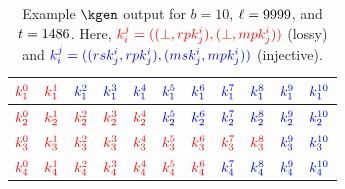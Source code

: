 \begin{table}
	\centering
	\begin{tabular}{|c|c|c|c|c|c|c|c|c|c|c|}
		\hline
		$\textcolor{red}{k^{0}_{1}}$ & $\textcolor{red}{k^{1}_{1}}$ & $\textcolor{blue}{k^{2}_{1}}$ & $\textcolor{blue}{k^{3}_{1}}$ & $\textcolor{blue}{k^{4}_{1}}$ & $\textcolor{blue}{k^{5}_{1}}$ & $\textcolor{blue}{k^{6}_{1}}$ & $\textcolor{blue}{k^{7}_{1}}$ & $\textcolor{blue}{k^{8}_{1}}$ & $\textcolor{blue}{k^{9}_{1}}$ & $\textcolor{blue}{k^{10}_{1}}$ \\
		\hline
		$\textcolor{red}{k^{0}_{2}}$ & $\textcolor{red}{k^{1}_{2}}$ & $\textcolor{red}{k^{2}_{2}}$  & $\textcolor{red}{k^{3}_{2}}$  & $\textcolor{red}{k^{4}_{2}}$  & $\textcolor{blue}{k^{5}_{2}}$ & $\textcolor{blue}{k^{6}_{2}}$ & $\textcolor{blue}{k^{7}_{2}}$ & $\textcolor{blue}{k^{8}_{2}}$ & $\textcolor{blue}{k^{9}_{2}}$ & $\textcolor{blue}{k^{10}_{2}}$ \\
		\hline
		$\textcolor{red}{k^{0}_{3}}$ & $\textcolor{red}{k^{1}_{3}}$ & $\textcolor{red}{k^{2}_{3}}$  & $\textcolor{red}{k^{3}_{3}}$  & $\textcolor{red}{k^{4}_{3}}$  & $\textcolor{red}{k^{5}_{3}}$  & $\textcolor{red}{k^{6}_{3}}$  & $\textcolor{red}{k^{7}_{3}}$  & $\textcolor{red}{k^{8}_{3}}$  & $\textcolor{blue}{k^{9}_{3}}$ & $\textcolor{blue}{k^{10}_{3}}$ \\
		\hline
		$\textcolor{red}{k^{0}_{4}}$ & $\textcolor{red}{k^{1}_{4}}$ & $\textcolor{red}{k^{2}_{4}}$  & $\textcolor{red}{k^{3}_{4}}$  & $\textcolor{red}{k^{4}_{4}}$  & $\textcolor{red}{k^{5}_{4}}$  & $\textcolor{red}{k^{6}_{4}}$  & $\textcolor{blue}{k^{7}_{4}}$ & $\textcolor{blue}{k^{8}_{4}}$ & $\textcolor{blue}{k^{9}_{4}}$ & $\textcolor{blue}{k^{10}_{4}}$ \\
		\hline
	\end{tabular}
	\caption[Example $\kgen$ output for $b=10$, $\maxt=9999$, and $\thr=1486$]{Example $\kgen$ output for $b=10$, $\maxt=9999$, and $\thr=1486$. Here, $\textcolor{red}{k^{j}_{i} = ((\bot, rpk^i_j), (\bot, mpk^i_j))}$  (lossy) and $\textcolor{blue}{k^j_i = ((rsk^i_j, rpk^i_j), (msk_j^i, mpk^i_j))}$ (injective).} \label{tab:expk}
\end{table}

